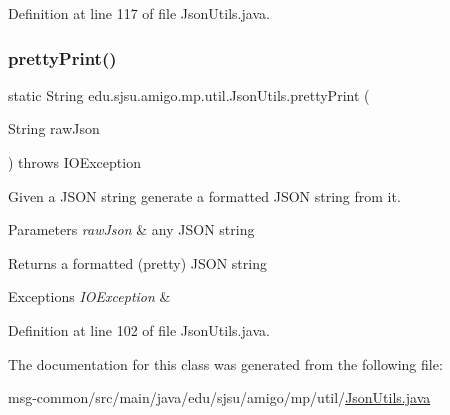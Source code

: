 Definition at line 117 of file Json\+Utils.\+java.

\mbox{\label{classedu_1_1sjsu_1_1amigo_1_1mp_1_1util_1_1_json_utils_a75f99520f5cde57bd3e44c372fc41f85}} 
\subsubsection{\texorpdfstring{pretty\+Print()}{prettyPrint()}}
{\footnotesize\ttfamily static String edu.\+sjsu.\+amigo.\+mp.\+util.\+Json\+Utils.\+pretty\+Print (\begin{DoxyParamCaption}\item[{String}]{raw\+Json }\end{DoxyParamCaption}) throws I\+O\+Exception\hspace{0.3cm}{\ttfamily [static]}}

Given a J\+S\+ON string generate a formatted J\+S\+ON string from it.


\begin{DoxyParams}{Parameters}
{\em raw\+Json} & any J\+S\+ON string \\
\hline
\end{DoxyParams}
\begin{DoxyReturn}{Returns}
a formatted (pretty) J\+S\+ON string 
\end{DoxyReturn}

\begin{DoxyExceptions}{Exceptions}
{\em I\+O\+Exception} & \\
\hline
\end{DoxyExceptions}


Definition at line 102 of file Json\+Utils.\+java.



The documentation for this class was generated from the following file\+:\begin{DoxyCompactItemize}
\item 
msg-\/common/src/main/java/edu/sjsu/amigo/mp/util/\hyperlink{_json_utils_8java}{Json\+Utils.\+java}\end{DoxyCompactItemize}
